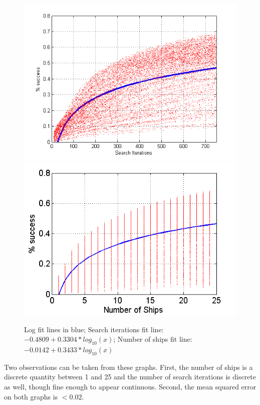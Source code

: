 \documentclass[a4paper]{article}
\begin{document}
\begin{figure}[H]\begin{center}
\includegraphics[scale=0.5]{../Matlab/Images/LogSearchIterPctSuccessMSE0.png}
\includegraphics[scale=0.5]{../Matlab/Images/LogShipCtPctSuccessMSE0.png}
\caption{Log fit lines in blue; Search iterations fit line: $-0.4809+0.3304*log_{10}(x)$; Number of ships fit line: $-0.0142+0.3433*log_{10}(x)$}
\end{center}\end{figure}

Two observations can be taken from these graphs. First, the number of ships is a discrete quantity between 1 and 25 and the number of search iterations is discrete as well, though fine enough to appear continuous. Second, the mean squared error on both graphs is $< 0.02$.
\end{document}
